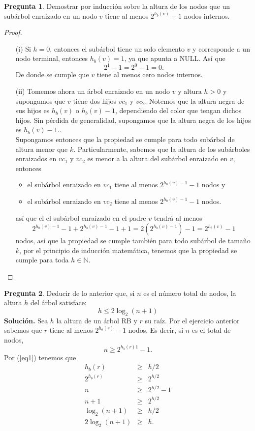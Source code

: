 \documentclass[12pt,letterpaper]{article}
\theoremstyle{definition}
\newtheorem{problm}{Pregunta}
\begin{document}
\begin{problm}
	Demostrar por inducción sobre la altura de los nodos que un subárbol enraizado en un nodo $ v $ tiene al menos $ 2^{h_b(v)}-1 $ nodos internos.
	\begin{proof}\textcolor{white}{text}
	\begin{itemize}
		\item[(i)] Si $ h = 0 $, entonces el subárbol tiene un solo elemento $ v $ y corresponde a un nodo terminal, entonces $ h_b (v) = 1 $, ya que apunta a NULL. Así que 
		\[ 2^1 -1 = 2^0 -1 = 0. \]
		De donde se cumple que $ v $ tiene al menos cero nodos internos.
		\item[(ii)] Tomemos ahora un árbol enraizado en un nodo $ v $  y altura $ h > 0 $ y supongamos que $ v $ tiene dos hijos $ vc_1 $ y $ vc_2 $. Notemos que la altura negra de sus hijos es $ h_b(v) $ o $ h_b(v) - 1 $, dependiendo del color que tengan dichos hijos. Sin pérdida de generalidad, supongamos que la altura negra de los hijos es $ h_b(v) -1.$.\\
		Supongamos entonces que la propiedad se cumple para todo subárbol de altura menor que $ k $. Particularmente, sabemos que la altura de los subárboles enraizados en $ vc_1 $ y $ vc_2 $ es menor a la altura del subárbol enraizado en $ v $, entonces
		\begin{itemize}
			\item el subárbol enraizado en $ vc_1 $ tiene al menos $ 2^{h_b(v)-1}-1 $ nodos y
			\item el subárbol enraizado en $ vc_2 $ tiene al menos $ 2^{h_b(v)-1}-1 $ nodos. 
		\end{itemize}
		así que el el subárbol enraízado en el padre $ v $ tendrá al menos 
		\[ 2^{h_b(v)-1} -1 + 2^{h_b(v)-1}-1 +1 =2\left(2^{h_b(v)-1}\right)-1 = 2^{h_b(v)}-1  \]
		nodos, así que la propiedad se cumple también para todo subárbol de tamaño $ k $, por el principio de inducción matemática, tenemos que la propiedad se cumple para toda $ h\in\mathbb{N} $.
	\end{itemize}
	\end{proof}
\end{problm}

\begin{problm}
	Deducir de lo anterior que, si $ n $ es el número total de nodos, la altura $ h $ del árbol satisface:
	\[ h \leq 2\log_2 (n+1) \]
	\textbf{Solución. } Sea $ h $ la altura de un árbol RB y $ r $ su raíz. Por el ejercicio anterior sabemos que $ r $ tiene al menos $ 2^{h_b(r)}-1 $ nodos. Es decir, si $ n $ es el total de nodos,
	\[ n \geq 2^{h_b(r)1}-1. \]
	Por (\ref{eq1}) tenemos que 
	\begin{eqnarray*}
		 h_b(r)     & \geq & h/2       \\
		 2^{h_b(r)} & \geq & 2^{h/2}   \\
		 n          & \geq & 2^{h/2}-1 \\
		 n+1        & \geq & 2^{h/2}   \\
		 \log_2 (n+1)& \geq & h/2      \\
		 2\log_2 (n+1)& \geq & h.       		 
	\end{eqnarray*}
\end{problm}
\end{document}

